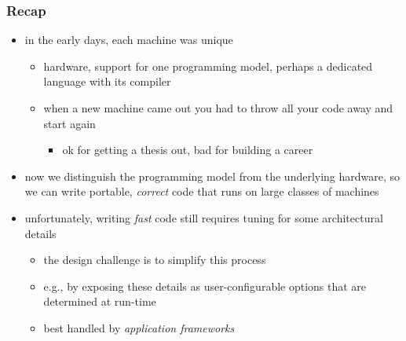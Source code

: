 \begin{frame}[fragile]
%
  \frametitle{Recap}
%
  \begin{itemize}
%
  \item in the early days, each machine was unique
    \begin{itemize}
      \item hardware, support for one programming model, perhaps a dedicated language with its
        compiler
%
      \item when a new machine came out you had to throw all your code away and start again
        \begin{itemize}
        \item ok for getting a thesis out, bad for building a career
        \end{itemize}
    \end{itemize}
%
  \item now we distinguish the programming model from the underlying hardware, so we can write
    portable, {\em correct} code that runs on large classes of machines
%
  \item unfortunately, writing {\em fast} code still requires tuning for some architectural
    details
    \begin{itemize}
      \item the design challenge is to simplify this process
      \item e.g., by exposing these details as user-configurable options that are determined at
        run-time
      \item best handled by {\em application frameworks}
    \end{itemize}
%
  \end{itemize}
%
\end{frame}

